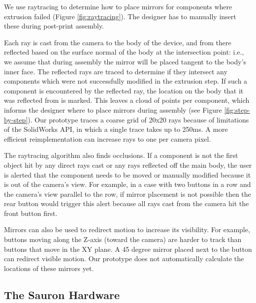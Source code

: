 We use raytracing to determine how to place mirrors for components where extrusion failed (Figure \ref{fig:raytracing}). The designer has to manually insert these during post-print assembly.  %

Each ray is cast from the camera to the body of the device, and from there reflected  based on the surface normal of the body at the intersection point: i.e., we assume that during assembly the mirror will be placed tangent to the body's inner face.  The reflected rays are traced to determine if they intersect any components which were not successfully modified in the extrusion step.  If such a component is encountered by the reflected ray, the location on the body that it was reflected from is marked.  This leaves a cloud of points per component, which informs the designer where to place mirrors during assembly (see Figure \ref{fig:step-by-step}).  Our prototype traces a coarse grid of 
20x20 rays because of limitations of the SolidWorks API, in which a single trace takes up to 250ms. A more efficient reimplementation can increase rays to one per camera pixel.

The raytracing algorithm also finds occlusions.  If a component %
is not the first object hit by any direct rays cast or any rays reflected off the main body, the user is alerted that the component needs to be moved or manually modified because it is out of the camera's view.  For example, in a case with two buttons in a row and the camera's view parallel to the row, if mirror placement is not possible then the rear button would trigger this alert because all rays cast from the camera hit the front button first.

Mirrors can also be used to redirect motion to increase its visibility. For example, buttons moving along the Z-axis (toward the camera) are harder to track than buttons that move in the XY plane. A 45 degree mirror placed next to the button can redirect visible motion. Our prototype does not automatically calculate the locations of these mirrors yet.

    \subsection{The Sauron Hardware}

